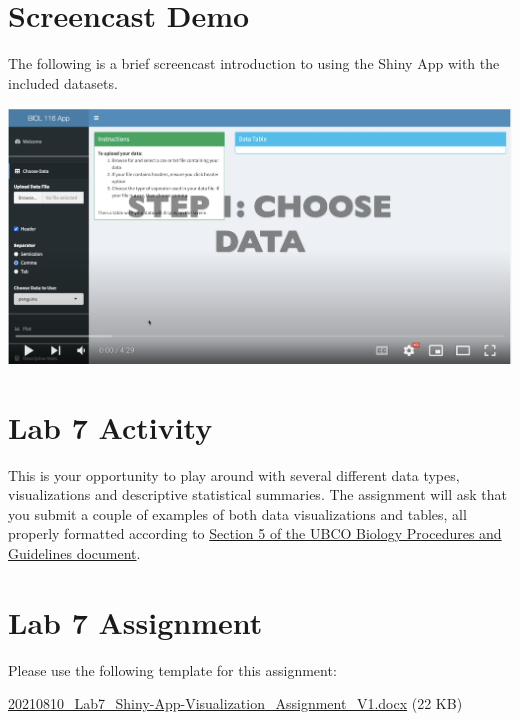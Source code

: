 \documentclass[
]{book}
\begin{document}
\hypertarget{screencast-demo}{%
\chapter*{Screencast Demo}\label{screencast-demo}}

The following is a brief screencast introduction to using the Shiny App with the included datasets.

\includegraphics{figures_images/Lab7-Fig1.png}

\hypertarget{lab-7-activity}{%
\chapter*{Lab 7 Activity}\label{lab-7-activity}}

This is your opportunity to play around with several different data types, visualizations and descriptive statistical summaries. The assignment will ask that you submit a couple of examples of both data visualizations and tables, all properly formatted according to \href{https://ubco-biology.github.io/Procedures-and-Guidelines/figures-tables.html}{Section 5 of the UBCO Biology Procedures and Guidelines document}.

\hypertarget{lab-7-assignment}{%
\chapter*{Lab 7 Assignment}\label{lab-7-assignment}}

Please use the following template for this assignment:

\href{files/20210810_Lab7_Shiny-App-Visualization_Assignment_V1.docx}{20210810\_Lab7\_Shiny-App-Visualization\_Assignment\_V1.docx} (22 KB)
\end{document}
